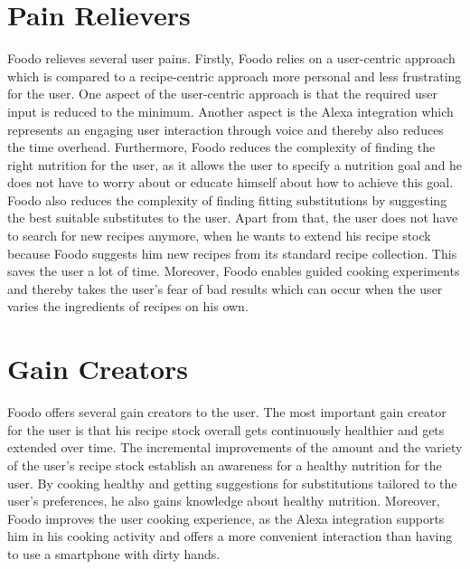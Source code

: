 \section{Pain Relievers}
Foodo relieves several user pains. Firstly, Foodo relies on a user-centric approach which is compared to a recipe-centric approach more personal and less frustrating for the user. One aspect of the user-centric approach is that the required user input is reduced to the minimum. Another aspect is the Alexa integration which represents an engaging user interaction through voice and thereby also reduces the time overhead. Furthermore, Foodo reduces the complexity of finding the right nutrition for the user, as it allows the user to specify a nutrition goal and he does not have to worry about or educate himself about how to achieve this  goal. Foodo also reduces the complexity of finding fitting substitutions by suggesting the best suitable substitutes to the user. Apart from that, the user does not have to search for new recipes anymore, when he wants to extend his recipe stock because Foodo suggests him new recipes from its standard recipe collection. This saves the user a lot of time. Moreover, Foodo enables guided cooking experiments and thereby takes the user's fear of bad results which can occur when the user varies the ingredients of recipes on his own.


\section{Gain Creators}
Foodo offers several gain creators to the user. The most important gain creator for the user is that his recipe stock overall gets continuously healthier and gets extended over time. The incremental improvements of the amount and the variety of the user's recipe stock establish an awareness for a healthy nutrition for the user. By cooking healthy and getting suggestions for substitutions tailored to the user's preferences, he also gains knowledge about healthy nutrition. Moreover, Foodo improves the user cooking experience, as the Alexa integration supports him in his cooking activity and offers a more convenient interaction than having to use a smartphone with dirty hands.


